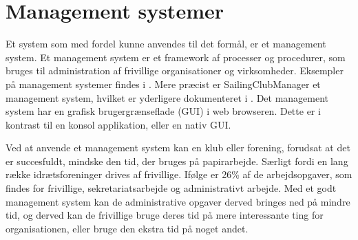 \section{Management systemer}\label{sec:management-systemer}


Et system som med fordel kunne anvendes til det formål, er et management system. Et management system er et framework af processer og procedurer, som bruges til administration af frivillige organisationer og virksomheder.  
Eksempler på management systemer findes i . 
Mere præcist er SailingClubManager et management system, hvilket er yderligere dokumenteret i . 
Det management system har en grafisk brugergrænseflade (GUI) i web browseren. 
Dette er i kontrast til en konsol applikation, eller en nativ GUI. 
\newline 

Ved at anvende et management system kan en klub eller forening, forudsat at det er succesfuldt, mindske den tid, der bruges på papirarbejde. Særligt fordi en lang række idrætsforeninger drives af frivillige. 
Ifølge \citet{Frivilligrapporten} er 26\% af de arbejdsopgaver, som findes for frivillige, sekretariatsarbejde og administrativt arbejde. Med et godt management system kan de administrative opgaver derved bringes ned på mindre tid, og derved kan de frivillige bruge deres tid på mere interessante ting for organisationen, eller bruge den ekstra tid på noget andet.




